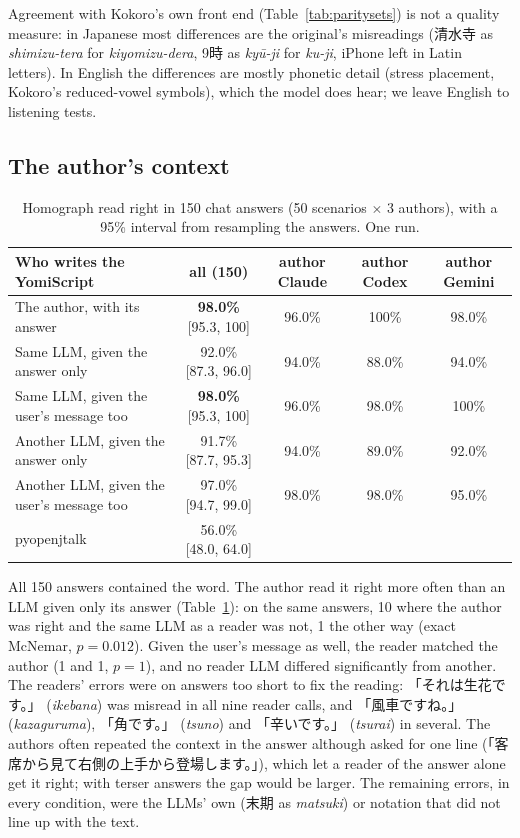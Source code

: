 \documentclass[11pt,a4paper]{article}
\begin{document}
Agreement with Kokoro's own front end (Table~\ref{tab:paritysets}) is not a quality measure: in Japanese most
differences are the original's misreadings (清水寺 as \emph{shimizu-tera} for \emph{kiyomizu-dera}, 9時 as
\emph{kyū-ji} for \emph{ku-ji}, iPhone left in Latin letters). In English the differences are mostly phonetic detail
(stress placement, Kokoro's reduced-vowel symbols), which the model does hear; we leave English to listening tests.

\subsection{The author's context}\label{sec:author}

\begin{table}[t]
\centering\small
\caption{Homograph read right in 150 chat answers (50 scenarios $\times$ 3 authors), with a 95\% interval from
resampling the answers. One run.}
\label{tab:author}
\begin{tabular}{lcccc}
\toprule
Who writes the YomiScript & all (150) & author Claude & author Codex & author Gemini\\
\midrule
The author, with its answer & \textbf{98.0\%} [95.3, 100] & 96.0\% & 100\% & 98.0\%\\
Same LLM, given the answer only & 92.0\% [87.3, 96.0] & 94.0\% & 88.0\% & 94.0\%\\
Same LLM, given the user's message too & \textbf{98.0\%} [95.3, 100] & 96.0\% & 98.0\% & 100\%\\
Another LLM, given the answer only & 91.7\% [87.7, 95.3] & 94.0\% & 89.0\% & 92.0\%\\
Another LLM, given the user's message too & 97.0\% [94.7, 99.0] & 98.0\% & 98.0\% & 95.0\%\\
pyopenjtalk & 56.0\% [48.0, 64.0] & & & \\
\bottomrule
\end{tabular}
\end{table}

All 150 answers contained the word. The author read it right more often than an LLM given only its answer
(Table~\ref{tab:author}): on the same answers, 10 where the author was right and the same LLM as a reader was not, 1
the other way (exact McNemar, $p = 0.012$). Given the user's message as well, the reader matched the author (1 and 1,
$p = 1$), and no reader LLM differed significantly from another. The readers' errors were on answers too short to fix
the reading: 「それは生花です。」 (\emph{ikebana}) was misread in all nine reader calls, and 「風車ですね。」
(\emph{kazaguruma}), 「角です。」 (\emph{tsuno}) and 「辛いです。」 (\emph{tsurai}) in several. The authors often repeated the
context in the answer although asked for one line (「客席から見て右側の上手から登場します。」), which let a reader of the
answer alone get it right; with terser answers the gap would be larger. The remaining errors, in every condition, were
the LLMs' own (末期 as \emph{matsuki}) or notation that did not line up with the text.
\end{document}
